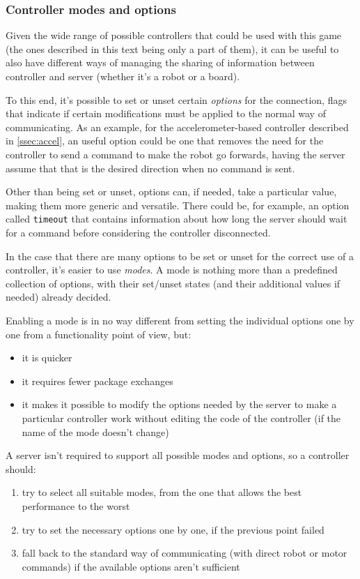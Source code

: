 \subsubsection{Controller modes and options}
  \label{sssec:optmode}
  Given the wide range of possible controllers that could be used
  with this game (the ones described in this text being only a part
  of them), it can be useful to also have different ways of managing
  the sharing of information between controller and server (whether
  it's a robot or a board).

  To this end, it's possible to set or unset certain
  \textit{options} for the connection, flags that indicate if
  certain modifications must be applied to the normal way of
  communicating. As an example, for the accelerometer-based
  controller described in \autoref{ssec:accel}, an useful option could
  be one that removes the need for the controller to send a command
  to make the robot go forwards, having the server assume that that
  is the desired direction when no command is sent.

  Other than being set or unset, options can, if needed, take a
  particular value, making them more generic and versatile. There
  could be, for example, an option called \texttt{timeout} that
  contains information about how long the server should wait for a
  command before considering the controller disconnected.

  In the case that there are many options to be set or unset for the
  correct use of a controller, it's easier to use \textit{modes}. A
  mode is nothing more than a predefined collection of options, with
  their set/unset states (and their additional values if needed)
  already decided.

  Enabling a mode is in no way different from setting the individual
  options one by one from a functionality point of view, but:
  \begin{itemize}
  \item it is quicker
  \item it requires fewer package exchanges
  \item it makes it possible to modify the options needed by the
    server to make a particular controller work without editing the
    code of the controller (if the name of the mode doesn't change)
  \end{itemize}

  A server isn't required to support all possible modes and options,
  so a controller should:
  \begin{enumerate}
  \item try to select all suitable modes, from the one that allows
    the best performance to the worst
  \item try to set the necessary options one by one, if the previous
    point failed
  \item fall back to the standard way of communicating (with direct
    robot or motor commands) if the available options aren't
    sufficient
  \end{enumerate}
